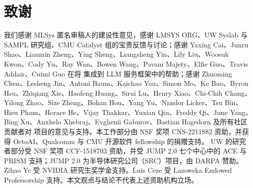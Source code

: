 \section{致谢}
\label{sec:acknowledgements}

我们感谢 MLSys 匿名审稿人的建设性意见，感谢 LMSYS ORG、UW Syslab 与 SAMPL 研究组、CMU Catalyst 组的宝贵反馈与讨论；感谢 Yaxing Cai、Junru Shao、Lianmin Zheng、Ying Sheng、Liangsheng Yin、Lily Liu、Woosuk Kwon、Cody Yu、Ray Wan、Bowen Wang、Pavani Majety、Elfie Guo、Travis Addair、Cuimi Guo 在将 \sys 集成到 LLM 服务框架中的帮助；感谢 Zhuoming Chen、Lesheng Jin、Antoni Baum、Kaichao You、Simon Mo、Ke Bao、Byron Hsu、Zhiqiang Xie、Haofeng Huang、Sirui Lu、Henry Xiao、Chi-Chih Chang、Yilong Zhao、Size Zheng、Bohan Hou、Yang Yu、Nandor Licker、Tsu Bin、Hieu Pham、Horace He、Vijay Thakkar、Yuxian Qiu、Freddy Qi、June Yang、Bing Xu、Anxhelo Xhebraj、Evghenii Gaburov、Bastian Hagedorn 及所有社区贡献者对 \sys 项目的意见与支持。本工作部分由 NSF 奖项 CNS-2211882 资助，并获得 OctoAI、Qualcomm 与 CMU 开源软件 fellowship 的捐赠支持。
UW 的研究者部分受 NSF 奖项 CCF-1518703 资助，并受 JUMP 2.0 七个中心中的 ACE 与 PRISM 支持；JUMP 2.0 为半导体研究公司（SRC）项目，由 DARPA 赞助。
Zihao Ye 受 NVIDIA 研究生奖学金支持。Luis Ceze 受 Lazowska Endowed Professorship 支持。本文观点与结论不代表上述资助机构立场。
